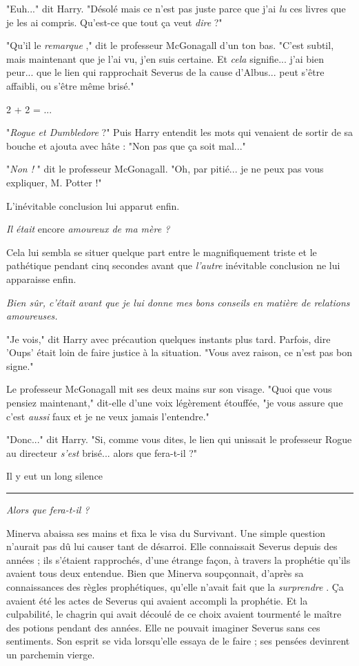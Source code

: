 "Euh..." dit Harry. "Désolé mais ce n'est pas juste parce que j'ai \emph{lu}  ces livres que je les ai compris. Qu'est-ce que tout ça veut \emph{dire } ?"

"Qu'il le \emph{remarque} ," dit le professeur McGonagall d'un ton bas. "C'est subtil, mais maintenant que je l'ai vu, j'en suis certaine. Et \emph{cela}  signifie... j'ai bien peur... que le lien qui rapprochait Severus de la cause d'Albus... peut s'être affaibli, ou s'être même brisé."

2 + 2 = ...

"\emph{Rogue et Dumbledore } ?" Puis Harry entendit les mots qui venaient de sortir de sa bouche et ajouta avec hâte : "Non pas que ça soit mal..."

"\emph{Non !} " dit le professeur McGonagall. "Oh, par pitié... je ne peux pas vous expliquer, M. Potter !"

L'inévitable conclusion lui apparut enfin.

\emph{Il était } encore\emph{ amoureux de ma mère ?} 

Cela lui sembla se situer quelque part entre le magnifiquement triste et le pathétique pendant cinq secondes avant que \emph{l'autre } inévitable conclusion ne lui apparaisse enfin.

\emph{Bien sûr, c'était avant que je lui donne mes bons conseils en matière de relations amoureuses.} 

"Je vois," dit Harry avec précaution quelques instants plus tard. Parfois, dire 'Oups' était loin de faire justice à la situation. "Vous avez raison, ce n'est pas bon signe."

Le professeur McGonagall mit ses deux mains sur son visage. "Quoi que vous pensiez maintenant," dit-elle d'une voix légèrement étouffée, "je vous assure que c'est \emph{aussi } faux et je ne veux jamais l'entendre."

"Donc..." dit Harry. "Si, comme vous dites, le lien qui unissait le professeur Rogue au directeur \emph{s'est}  brisé... alors que fera-t-il ?"

Il y eut un long silence
\par\noindent\rule{\textwidth}{0.4pt}
\emph{Alors que fera-t-il ?} 

Minerva abaissa ses mains et fixa le visa du Survivant. Une simple question n'aurait pas dû lui causer tant de désarroi. Elle connaissait Severus depuis des années ; ils s'étaient rapprochés, d'une étrange façon, à travers la prophétie qu'ils avaient tous deux entendue. Bien que Minerva soupçonnait, d'après sa connaissances des règles prophétiques, qu'elle n'avait fait que la \emph{surprendre} . Ça avaient été les actes de Severus qui avaient accompli la prophétie. Et la culpabilité, le chagrin qui avait découlé de ce choix avaient tourmenté le maître des potions pendant des années. Elle ne pouvait imaginer Severus sans ces sentiments. Son esprit se vida lorsqu'elle essaya de le faire ; ses pensées devinrent un parchemin vierge.

